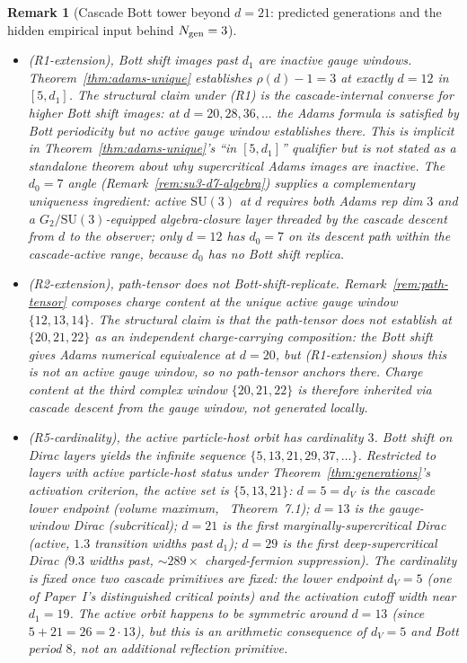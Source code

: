 \documentclass[12pt,a4paper]{article}
\newtheorem{remark}[theorem]{Remark}
\begin{document}
\begin{remark}[Cascade Bott tower beyond $d=21$: predicted generations and the hidden empirical input behind $N_{\rm gen}=3$]
\begin{itemize}[nosep]
\item \emph{(R1-extension), Bott shift images past $d_1$ are inactive gauge windows.} Theorem~\ref{thm:adams-unique} establishes $\rho(d)-1=3$ at exactly $d=12$ in $[5,d_1]$. The structural claim under (R1) is the cascade-internal converse for higher Bott shift images: at $d=20,28,36,\ldots$ the Adams formula is satisfied by Bott periodicity but no active gauge window establishes there. This is implicit in Theorem~\ref{thm:adams-unique}'s ``in $[5,d_1]$'' qualifier but is not stated as a standalone theorem about why supercritical Adams images are inactive. The $d_0=7$ angle (Remark~\ref{rem:su3-d7-algebra}) supplies a complementary uniqueness ingredient: active $\mathrm{SU}(3)$ at $d$ requires both Adams rep dim $3$ and a $G_2/\mathrm{SU}(3)$-equipped algebra-closure layer threaded by the cascade descent from $d$ to the observer; only $d=12$ has $d_0=7$ on its descent path within the cascade-active range, because $d_0$ has no Bott shift replica.
\item \emph{(R2-extension), path-tensor does not Bott-shift-replicate.} Remark~\ref{rem:path-tensor} composes charge content at the unique active gauge window $\{12,13,14\}$. The structural claim is that the path-tensor does not establish at $\{20,21,22\}$ as an independent charge-carrying composition: the Bott shift gives Adams numerical equivalence at $d=20$, but (R1-extension) shows this is not an active gauge window, so no path-tensor anchors there. Charge content at the third complex window $\{20,21,22\}$ is therefore inherited via cascade descent from the gauge window, not generated locally.
\item \emph{(R5-cardinality), the active particle-host orbit has cardinality $3$.} Bott shift on Dirac layers yields the infinite sequence $\{5,13,21,29,37,\ldots\}$. Restricted to layers with active particle-host status under Theorem~\ref{thm:generations}'s activation criterion, the active set is $\{5,13,21\}$: $d=5=d_V$ is the cascade lower endpoint (volume maximum, \cite{part0}~Theorem~7.1); $d=13$ is the gauge-window Dirac (subcritical); $d=21$ is the first marginally-supercritical Dirac (active, $1.3$ transition widths past $d_1$); $d=29$ is the first deep-supercritical Dirac ($9.3$ widths past, $\sim 289\times$ charged-fermion suppression). The cardinality is fixed once two cascade primitives are fixed: the lower endpoint $d_V=5$ (one of Paper~I's distinguished critical points) and the activation cutoff width near $d_1=19$. The active orbit happens to be symmetric around $d=13$ (since $5+21 = 26 = 2 \cdot 13$), but this is an arithmetic consequence of $d_V = 5$ and Bott period $8$, not an additional reflection primitive.
\end{itemize}


\end{remark}
\end{document}

